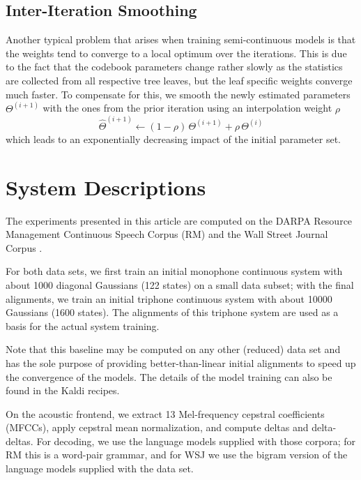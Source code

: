 \documentclass{article}
\begin{document}
\subsection{Inter-Iteration Smoothing}
Another typical problem that arises when training semi-continuous models is
that the weights tend to converge to a local optimum over the iterations. 
This is due to the fact that the codebook parameters change rather slowly 
as the statistics are collected from all respective tree leaves, but the 
leaf specific weights converge much faster.
%
To compensate for this, we smooth the newly estimated parameters $\Theta^{(i+1)}$ with the ones from the prior iteration using an interpolation weight $\rho$
\begin{equation}
\hat\Theta^{(i+1)} \leftarrow (1 - \rho) \, \Theta^{(i+1)} + \rho \, \Theta^{(i)} %
\end{equation}
which leads to an exponentially decreasing impact of the initial parameter set.


\section{System Descriptions}
\label{sec:sys}

The experiments presented in this article are computed on the DARPA Resource 
Management Continuous Speech Corpus (RM) \cite{price1993rm} and the Wall Street
Journal Corpus \cite{garofalo2007wsj}.

For both data sets, we first train an initial monophone continuous system
with about 1000 diagonal Gaussians (122 states) on a small data subset; with 
the final alignments, we train an initial triphone continuous system with 
about 10000 Gaussians (1600 states).  The alignments of this triphone system
are used as a basis for the actual system training.

Note that this baseline may be computed on any other (reduced) data set
and has the sole purpose of providing better-than-linear initial alignments
to speed up the convergence of the models.
%
The details of the model training can also be found in the {\sc Kaldi} recipes.

On the acoustic frontend, we extract 13 Mel-frequency cepstral coefficients (MFCCs),
apply cepstral mean normalization, and compute deltas and delta-deltas.  For
decoding, we use the language models supplied with those corpora; for RM this
is a word-pair grammar, and for WSJ we use the bigram version of the language
models supplied with the data set.
\end{document}
